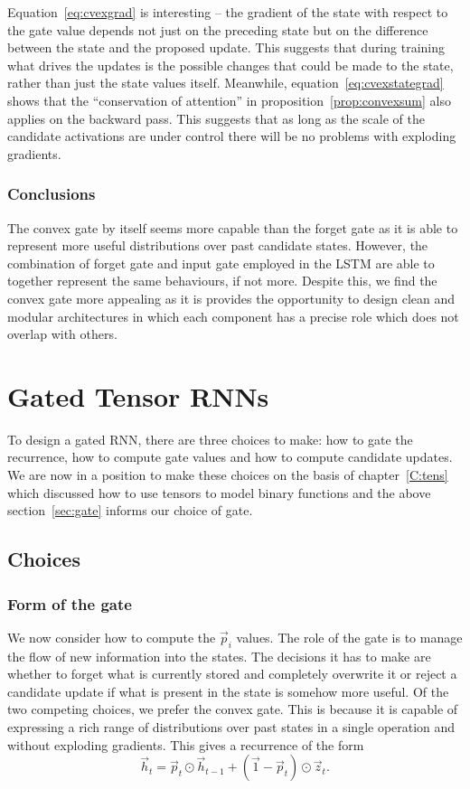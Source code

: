 Equation~\eqref{eq:cvexgrad} is interesting -- the gradient of the state with respect to the gate value
depends not just on the preceding state but on the difference between the state and the proposed
update. This suggests that during training what drives the updates is the possible changes that could be
made to the state, rather than just the state values itself. Meanwhile, equation~\eqref{eq:cvexstategrad}
shows that the ``conservation of attention'' in proposition~\ref{prop:convexsum} also applies on the
backward pass. This suggests that as long as the scale of the candidate activations are under control
there will be no problems with exploding gradients.


\subsubsection{Conclusions}
The convex gate by itself seems more capable than the forget gate as it is able to represent more
useful distributions over past candidate states. However, the combination of forget gate and input
gate employed in the LSTM are able to together represent the same behaviours, if not more. 
Despite this, we find the convex gate more appealing as it is provides the opportunity to design clean
and modular architectures in which each component has a precise role which does not overlap with others.



\section{Gated Tensor RNNs}
To design a gated RNN, there are three choices to make: how to gate the recurrence, how to compute
gate values and how to compute candidate updates. We are now in a position to make these choices on the
basis of chapter~\ref{C:tens} which discussed how to use tensors to model binary functions and
the above section~\ref{sec:gate} informs our choice of gate.



\subsection{Choices}
\subsubsection{Form of the gate}
We now consider how to compute the \(\vec{p}_i\) values.
The role of the gate is to manage the flow of new information into the states. The decisions it has to
make are whether to forget what is currently stored and completely overwrite it or reject a candidate
update if what is present in the state is somehow more useful. Of the two competing choices, we prefer
the convex gate. This is because it is capable of expressing a rich range of distributions over past
states in a single operation and without exploding gradients.
This gives a recurrence of the form
\begin{equation}\label{eq:propgate}
	\vec{h}_t = \vec{p}_t \odot \vec{h}_{t-1} + (\vec{1} - \vec{p}_t) \odot \vec{z}_t.
\end{equation}

